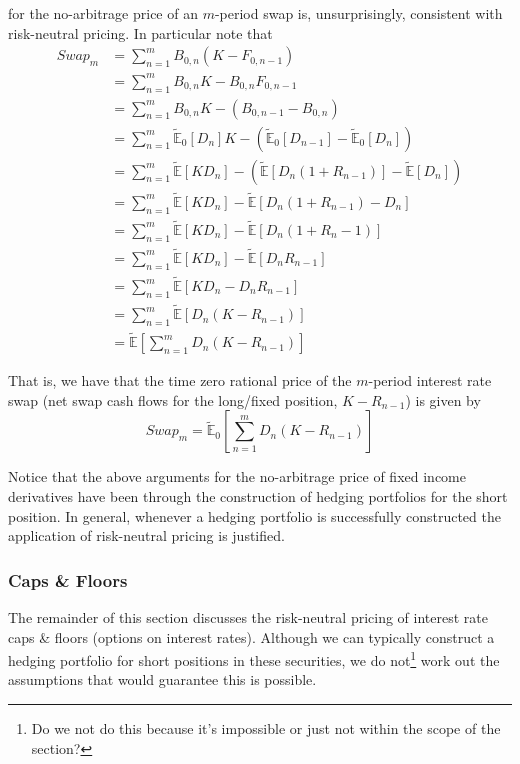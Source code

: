 \documentclass[12pt]{article}
\newlength\tindent
\renewcommand{\indent}{\hspace*{\tindent}}
\newcommand{\E}{\mathbb E}
\begin{document}
for the no-arbitrage price of an $m$-period swap is, unsurprisingly, consistent with risk-neutral pricing. In particular note that
\begin{align*}
	Swap_m &= \sum^m_{n = 1} B_{0,n}(K - F_{0,n - 1})  \\
	&= \sum^m_{n = 1} B_{0,n}K - B_{0,n}F_{0,n - 1} \\
	&= \sum^m_{n = 1} B_{0,n}K - (B_{0,n - 1} - B_{0,n}) \\
	&= \sum^m_{n = 1} \tilde{\E}_0[D_n]K - \left( \tilde{\E}_0[D_{n - 1}] - \tilde{\E}_0[D_n] \right) \\
	&= \sum^m_{n = 1} \tilde{\E}[K D_n] - \left( \tilde{\E}[ D_n(1 + R_{n - 1})] - \tilde{\E}[D_n] \right) \\
	&= \sum^m_{n = 1} \tilde{\E}[K D_n] - \tilde{\E}[D_n(1 + R_{n - 1}) - D_n] \\
	&= \sum^m_{n = 1} \tilde{\E}[K D_n] - \tilde{\E}[D_n(1 + R_n - 1)] \\
	&= \sum^m_{n = 1} \tilde{\E}[K D_n] - \tilde{\E}[D_nR_{n - 1}] \\
	&= \sum^m_{n = 1} \tilde{\E}[ K D_n - D_nR_{n - 1}] \\
	&= \sum^m_{n = 1} \tilde{\E}[D_n(K - R_{n - 1})] \\
	&= \tilde{\E} \left[ \sum^m_{n = 1} D_n(K - R_{n - 1}) \right]
\end{align*}

\indent That is, we have that the time zero rational price of the $m$-period interest rate swap (net swap cash flows for the long/fixed position, $K - R_{n - 1}$) is given by
\begin{equation*}
	Swap_m = \tilde{\E}_0 \left[ \sum^m_{n = 1} D_n(K - R_{n - 1}) \right]
\end{equation*}

\indent Notice that the above arguments for the no-arbitrage price of fixed income derivatives have been through the construction of hedging portfolios for the short position. In general, whenever a hedging portfolio is successfully constructed the application of risk-neutral pricing is justified. \\

\subsubsection{Caps \& Floors}

\indent The remainder of this section discusses the risk-neutral pricing of interest rate caps \& floors (options on interest rates). Although we can typically construct a hedging portfolio for short positions in these securities, we do not\footnote{Do we not do this because it's impossible or just not within the scope of the section?} work out the assumptions that would guarantee this is possible. \\
\end{document}

